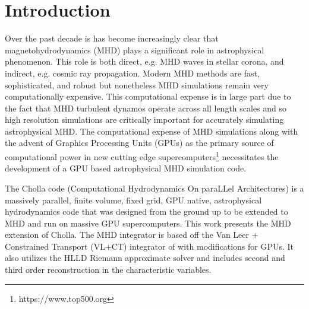 \section{Introduction}
\label{sec:intro}


Over the past decade is has become increasingly clear that magnetohydrodynamics (MHD) plays a significant role in astrophysical phenomenon. This role is both direct, e.g. MHD waves in stellar corona, and indirect, e.g. cosmic ray propagation. Modern MHD methods are fast, sophisticated, and robust but nonetheless MHD simulations remain very computationally expensive. This computational expense is in large part due to the fact that MHD turbulent dynamos operate across all length scales and so high resolution simulations are critically important for accurately simulating astrophysical MHD. The computational expense of MHD simulations along with the advent of Graphics Processing Units (GPUs) as the primary source of computational power in new cutting edge supercomputers\footnote{https://www.top500.org} necessitates the development of a GPU based astrophysical MHD simulation code. 

The Cholla code (Computational Hydrodynamics On paraLLel Architectures)\citep{schneider_2015} is a massively parallel, finite volume, fixed grid, GPU native, astrophysical hydrodynamics code that was designed from the ground up to be extended to MHD and run on massive GPU supercomputers. This work presents the MHD extension of Cholla. The MHD integrator is based off the Van Leer + Constrained Transport (VL+CT) integrator of \cite{stone_2009} with modifications for GPUs. It also utilizes the HLLD Riemann approximate solver and includes second and third order reconstruction in the characteristic variables.

